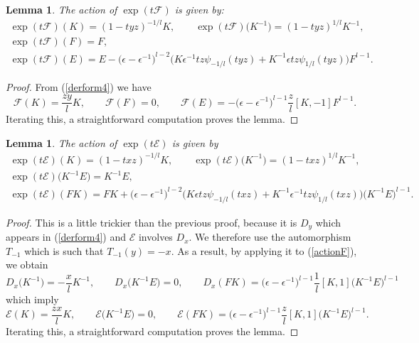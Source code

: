 \documentclass[pdftex]{sigma}%
\numberwithin{equation}{section}
\numberwithin{figure}{section}
\newtheorem{lem}[teo]{Lemma}
\begin{document}
\begin{lem}%
The action of $\exp(t{\mathcal F})$ is given by:
\begin{gather*}
\exp(t{\mathcal F})(K) =(1-tyz)^{-1/l}K, \qquad
\exp(t{\mathcal F})\big(K^{-1}\big)=(1-tyz)^{1/l}K^{-1},
\\
\exp(t{\mathcal F})(F) =F,
\\
\exp(t{\mathcal F})(E) =E-\big(\epsilon-\epsilon^{-1}\big)^{l-2}\big(K\epsilon^{-1} tz\psi_{-1/l}(tyz)+K^{-1}\epsilon tz\psi_{1/l}(tyz)\big)F^{l-1}.
\end{gather*}
\end{lem}

\begin{proof}
From (\ref{derform4}) we have
\begin{equation}\label{actionF}
{\mathcal F}(K)=\frac{zy}{l}K,\qquad
{\mathcal F}(F)=0, {\qquad
\mathcal F}(E)=-\big(\epsilon-\epsilon^{-1}\big)^{l-1}\frac{z}{l}[K,-1]F^{l-1}.
\end{equation}
 Iterating this, a straightforward computation proves the lemma.\end{proof}

\begin{lem} %
The action of $\exp(t{\mathcal E})$ is given by
\begin{gather*}
\exp(t{\mathcal E})(K) =(1-txz)^{-1/l}K, \qquad
\exp(t{\mathcal E})\big(K^{-1}\big)=(1-txz)^{1/l}K^{-1},
\\
\exp(t{\mathcal E})\big(K^{-1}E\big) =K^{-1}E,
\\
\exp(t{\mathcal E})(FK) =FK+\big(\epsilon-\epsilon^{-1}\big)^{l-2}\big(K\epsilon tz\psi_{-1/l}(txz)+K^{-1}\epsilon^{-1} tz\psi_{1/l}(txz)\big)\big(K^{-1}E\big)^{l-1}.
\end{gather*}

\end{lem}
\begin{proof} This is a little trickier than the previous proof, because it is $D_y$ which appears in (\ref{derform4}) and ${\mathcal E}$ involves $D_x.$
We therefore use the automorphism $T_{-1}$ which is such that $T_{-1}(y)=-x$. As a result, by applying it to (\ref{actionF}), we obtain
\begin{equation*}
D_x\big(K^{-1}\big)=-\frac{x}{l}K^{-1}, \qquad
D_x\big(K^{-1}E\big)=0, \qquad
D_x(FK)=\big(\epsilon-\epsilon^{-1}\big)^{l-1}\frac{1}{l}[K,1]\big(K^{-1}E\big)^{l-1}
\end{equation*}
which imply
\begin{equation*}
{\mathcal E}(K)=\frac{zx}{l}K,\qquad
{\mathcal E}\big(K^{-1}E\big)=0, \qquad
{\mathcal E}(FK)=\big(\epsilon-\epsilon^{-1}\big)^{l-1}\frac{z}{l}[K,1]\big(K^{-1}E\big)^{l-1}.
\end{equation*}
 Iterating this, a straightforward computation proves the lemma.
 \end{proof}
\end{document}
